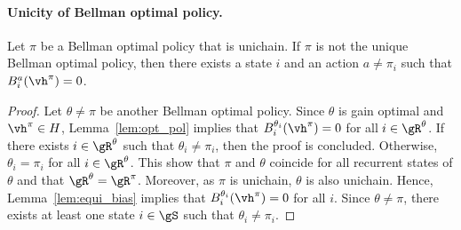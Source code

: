 \paragraph{Unicity of Bellman optimal policy.}
\label{ssec:unicity}

\begin{lem}
    \label{lem:unicity_BO}
    Let $\pi$ be a Bellman optimal policy that is unichain. If $\pi$ is not the unique Bellman optimal policy, then there exists a state $i$ and an action $a\neq\pi_i$ such that $B_i^a(\vh^\pi)=0$.
\end{lem}
\begin{proof}
    Let $\theta\neq\pi$ be another Bellman optimal policy. Since $\theta$ is gain optimal and $\vh^\pi\in H$, Lemma~\ref{lem:opt_pol} implies that $B_i^{\theta_i}(\vh^\pi) =0$ for all $i\in\gR^\theta$. If there exists $i\in\gR^\theta$ such that $\theta_i\neq\pi_i$, then the proof is concluded.  Otherwise, $\theta_i=\pi_i$ for all $i\in\gR^\theta$. This show that $\pi$ and $\theta$ coincide for all recurrent states of $\theta$ and that $\gR^\theta=\gR^\pi$. Moreover, as $\pi$ is unichain, $\theta$ is also unichain. Hence, Lemma~\ref{lem:equi_bias} implies that $B_i^{\theta_i}(\vh^\pi)=0$ for all $i$. Since $\theta\neq\pi$, there exists at least one state $i\in\gS$ such that $\theta_i\neq\pi_i$.
\end{proof}




